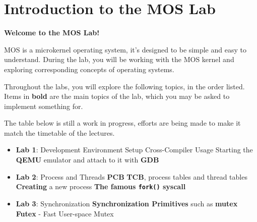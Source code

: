 \chapter*{Introduction to the MOS Lab}

\textbf{Welcome to the MOS Lab!}

MOS is a microkernel operating system, it's designed to be simple and easy to understand.
During the lab, you will be working with the MOS kernel and exploring corresponding concepts of
operating systems.

Throughout the labs, you will explore the following topics, in the order listed. Items in
\textbf{bold} are the main topics of the lab, which you may be asked to implement something for.

\begin{warning}
    \item The table below is still a work in progress, efforts are being made to make it match the
    timetable of the lectures.
\end{warning}

\begin{itemize}
    \item \textbf{Lab 1}: Development Environment Setup
          \subitem Cross-Compiler Usage
          \subitem Starting the \textbf{QEMU} emulator and attach to it with \textbf{GDB}
    \item \textbf{Lab 2}: Process and Threads
          \subitem \textbf{PCB} \textbf{TCB}, process tables and thread tables
          \subitem \textbf{Creating} a new process
          \subitem \textbf{The famous \texttt{fork()} syscall}
    \item \textbf{Lab 3}: Synchronization
          \subitem \textbf{Synchronization Primitives} such as \textbf{mutex}
          \subitem \textbf{Futex} - Fast User-space Mutex
\end{itemize}
